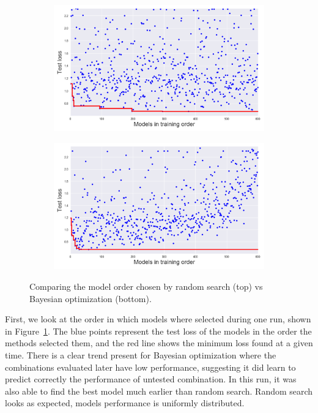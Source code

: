 \begin{figure}[htbp]
	\begin{subfigure}[b]{\textwidth}
            \centering
            \includegraphics[width=\linewidth]{img_hyperopt/cifar_random}
    \end{subfigure}%
    
    \begin{subfigure}[b]{\textwidth}
            \centering
            \includegraphics[width=\linewidth]{img_hyperopt/cifar_bo}
    \end{subfigure}%
    \caption{Comparing the model order chosen by random search (top) vs Bayesian optimization (bottom).}
	\label{fig:cifar_loss}
\end{figure}

First, we look at the order in which models where selected during one run, shown in Figure~\ref{fig:cifar_loss}. The blue points represent the test loss of the models in the order the methods selected them, and the red line shows the minimum loss found at a given time. There is a clear trend present for Bayesian optimization where the combinations evaluated later have low performance, suggesting it did learn to predict correctly the performance of untested combination. In this run, it was also able to find the best model much earlier than random search. Random search looks as expected, models performance is uniformly distributed.

